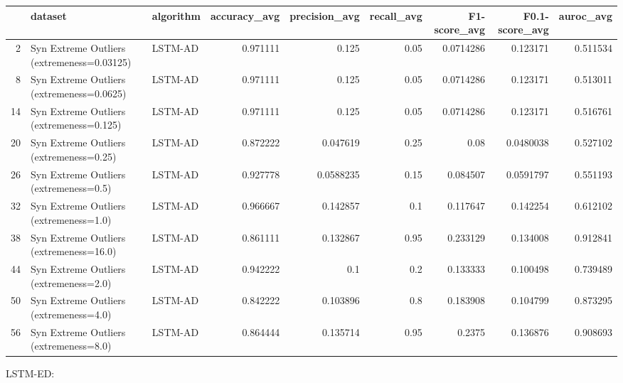 \begin{tabular}{rllrrrrrr}
\hline
    & dataset                                    & algorithm   &   accuracy\_avg &   precision\_avg &   recall\_avg &   F1-score\_avg &   F0.1-score\_avg &   auroc\_avg \\
\hline
  2 & Syn Extreme Outliers (extremeness=0.03125) & LSTM-AD     &       0.971111 &       0.125     &         0.05 &      0.0714286 &        0.123171  &    0.511534 \\
  8 & Syn Extreme Outliers (extremeness=0.0625)  & LSTM-AD     &       0.971111 &       0.125     &         0.05 &      0.0714286 &        0.123171  &    0.513011 \\
 14 & Syn Extreme Outliers (extremeness=0.125)   & LSTM-AD     &       0.971111 &       0.125     &         0.05 &      0.0714286 &        0.123171  &    0.516761 \\
 20 & Syn Extreme Outliers (extremeness=0.25)    & LSTM-AD     &       0.872222 &       0.047619  &         0.25 &      0.08      &        0.0480038 &    0.527102 \\
 26 & Syn Extreme Outliers (extremeness=0.5)     & LSTM-AD     &       0.927778 &       0.0588235 &         0.15 &      0.084507  &        0.0591797 &    0.551193 \\
 32 & Syn Extreme Outliers (extremeness=1.0)     & LSTM-AD     &       0.966667 &       0.142857  &         0.1  &      0.117647  &        0.142254  &    0.612102 \\
 38 & Syn Extreme Outliers (extremeness=16.0)    & LSTM-AD     &       0.861111 &       0.132867  &         0.95 &      0.233129  &        0.134008  &    0.912841 \\
 44 & Syn Extreme Outliers (extremeness=2.0)     & LSTM-AD     &       0.942222 &       0.1       &         0.2  &      0.133333  &        0.100498  &    0.739489 \\
 50 & Syn Extreme Outliers (extremeness=4.0)     & LSTM-AD     &       0.842222 &       0.103896  &         0.8  &      0.183908  &        0.104799  &    0.873295 \\
 56 & Syn Extreme Outliers (extremeness=8.0)     & LSTM-AD     &       0.864444 &       0.135714  &         0.95 &      0.2375    &        0.136876  &    0.908693 \\
\hline
\end{tabular}

LSTM-ED:

